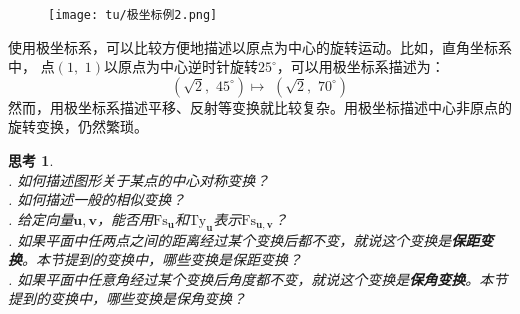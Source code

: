 \documentclass[12pt,UTF8]{ctexbook}
\theoremstyle{definition}
\theoremstyle{plain}
\newtheorem{sk}{思考}[section]
\begin{document}
\begin{figure}[h] %
    \vspace{4pt}
    \centering
    \texttt{[image: tu/极坐标例2.png]}
\end{figure}

使用极坐标系，可以比较方便地描述以原点为中心的旋转运动。比如，直角坐标系中，
点$(1,\,\,1)$以原点为中心逆时针旋转$25^\circ$，可以用极坐标系描述为：
$$ \left(\sqrt{2}, \,\, 45^\circ\right) \mapsto \,\, \left(\sqrt{2}, \,\, 70^\circ\right)$$
然而，用极坐标系描述平移、反射等变换就比较复杂。用极坐标描述中心非原点的旋转变换，仍然繁琐。

\begin{sk}
    \mbox{}\\
    . 如何描述图形关于某点的中心对称变换？ \\
    . 如何描述一般的相似变换？\\
    . 给定向量$\mathbf{u}, \mathbf{v}$，能否用$\mathrm{Fs}_{\mathbf{u}}$和$\mathrm{Ty}_{\mathbf{u}}$表示$\mathrm{Fs}_{\mathbf{u}, \mathbf{v}}$？\\
    . 如果平面中任两点之间的距离经过某个变换后都不变，就说这个变换是\textbf{保距变换}。本节提到的变换中，哪些变换是保距变换？\\
    . 如果平面中任意角经过某个变换后角度都不变，就说这个变换是\textbf{保角变换}。本节提到的变换中，哪些变换是保角变换？
\end{sk}
\end{document}
